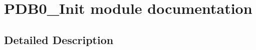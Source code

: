\hypertarget{group___p_d_b0___init__module}{}\section{P\+D\+B0\+\_\+\+Init module documentation}
\label{group___p_d_b0___init__module}


\subsection{Detailed Description}
